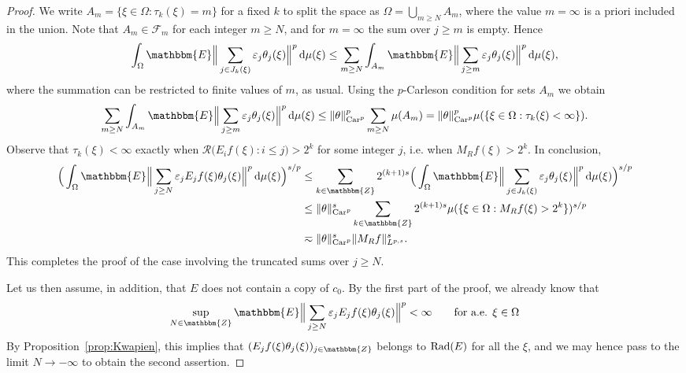\documentclass[a4paper,10pt]{amsart}
\theoremstyle{plain}
\theoremstyle{definition}
\theoremstyle{remark}
\begin{document}
\begin{proof}
    We write $A_m = \{ \xi\in\Omega : \tau_k(\xi ) = m \}$ for a fixed $k$ to split the space as
    $\Omega = \bigcup_{m\geq N} A_m$, where the value $m=\infty$ is a priori included in the union. Note that $A_m\in\mathcal{F}_m$
    for each integer $m\geq N$, and for $m=\infty$ the sum over $j\geq m$ is empty. Hence
    \begin{equation*}
      \int_{\Omega} {\mathbbm{E}} \Big\| \sum_{j\in J_k(\xi)}
        \varepsilon_j \theta_j(\xi ) \Big\|^p {\,\text{d}}\mu (\xi )
      \leq \sum_{m\geq N} 
      \int_{A_m} {\mathbbm{E}} \Big\| \sum_{j\geq m} \varepsilon_j \theta_j (\xi ) \Big\|^p {\,\text{d}}\mu (\xi ),
    \end{equation*}
    where the summation can be restricted to finite values of $m$, as usual.
    Using the $p$-Carleson condition for sets $A_m$ 
    we obtain
    \begin{equation*}
      \sum_{m\geq N} \int_{A_m} {\mathbbm{E}} \Big\| \sum_{j\geq m} \varepsilon_j \theta_j (\xi ) \Big\|^p {\,\text{d}}\mu (\xi )
      \leq \| \theta \|_{\text{Car}^p}^p \sum_{m\geq N} \mu (A_m)
      = \| \theta \|_{\text{Car}^p}^p \mu ( \{ \xi\in\Omega : \tau_k(\xi ) < \infty \} ) .
    \end{equation*}
    Observe that $\tau_k(\xi ) < \infty$ exactly when 
    $\mathcal{R} \Big( E_if(\xi ) : i\leq j \Big) > 2^k$ for some integer $j$, i.e. when
    $M_Rf(\xi ) > 2^k$. In conclusion,   
    \begin{align*}
      \Big( \int_{\Omega} {\mathbbm{E}} \Big\| 
        \sum_{j\geq N} \varepsilon_j E_jf (\xi ) \theta_j (\xi ) \Big\|^p {\,\text{d}}\mu (\xi ) \Big)^{s/p}
      &\leq \sum_{k\in{\mathbbm{Z}}} 2^{(k+1)s} 
            \Big( \int_{\Omega} {\mathbbm{E}} \Big\| \sum_{j\in J_k(\xi)}
            \varepsilon_j \theta_j (\xi ) \Big\|^p {\,\text{d}}\mu (\xi ) \Big)^{s/p} \\
      &\leq \| \theta \|_{\text{Car}^p}^s 
        \sum_{k\in{\mathbbm{Z}}} 2^{(k+1)s} \mu ( \{ \xi\in\Omega : M_Rf(\xi ) > 2^k \} )^{s/p} \\
      &\eqsim \| \theta \|_{\text{Car}^p}^s \| M_Rf \|_{L^{p,s}}^s .
    \end{align*}
This completes the proof of the case involving the truncated sums over $j\geq N$.

Let us then assume, in addition, that $E$ does not contain a copy of $c_0$. By the first part of the proof, we already know that
\begin{equation*}
  \sup_{N\in{\mathbbm{Z}}}{\mathbbm{E}} \Big\| 
        \sum_{j\geq N} \varepsilon_j E_jf (\xi ) \theta_j (\xi ) \Big\|^p<\infty\qquad\text{for a.e. }\xi\in\Omega
\end{equation*}
By Proposition~\ref{prop:Kwapien}, this implies that $(E_jf(\xi)\theta_j(\xi))_{j\in{\mathbbm{Z}}}$ belongs to $\textup{Rad}(E)$ for all the $\xi$, and we may hence pass to the limit $N\to-\infty$ to obtain the second assertion.
 \end{proof}
 
\end{document}
